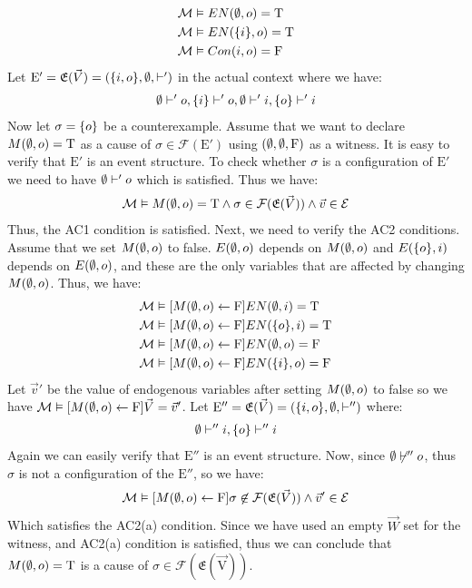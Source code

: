 \begin{example}
\begin{align*}
        \mathcal{M} & \vDash EN(\emptyset,o) = \mathrm{T}    \\
        \mathcal{M} & \vDash EN(\{i\},o) = \mathrm{T} \\
        \mathcal{M} & \vDash Con(i,o) = \mathrm{F}    \\
    \end{align*}
    Let $\mathrm{E'} = \mathfrak{E}(\vec V) = (\{i,o\},\emptyset,\vdash')$ 
    in the actual context where we have:
    \begin{align*}
        \emptyset \vdash' o, \{i\} \vdash' o, \emptyset \vdash' i, 
        \{o\} \vdash' i
    \end{align*}
    Now let $\sigma = \{o\}$ be a counterexample.     
    Assume that we want to declare $M(\emptyset,o) = \mathrm{T}$ as a cause of 
    $\sigma \in \mathcal{F}(\mathrm{E'})$ using $(\emptyset,\emptyset,\mathrm{F})$ as a witness.
    It is easy to verify that $\mathrm{E'}$ is an event structure.
    To check whether $\sigma$ is a configuration of $\mathrm{E'}$ we need
    to have $\emptyset \vdash' o$ which is satisfied.
    Thus we have:
    \begin{align*}
        \mathcal{M} \vDash M(\emptyset,o) = \mathrm{T} \wedge \sigma 
        \in \mathcal{F}(\mathfrak{E}(\vec V)) \wedge \vec v \in \mathcal{E}
    \end{align*}
    Thus, the AC1 condition is satisfied.
    Next, we need to verify the AC2 conditions.
    Assume that we set $M(\emptyset,o)$ to false.
    $E(\emptyset,o)$ depends on $M(\emptyset,o)$ and $E(\{o\},i)$ depends on $E(\emptyset,o)$,
    and these are the only variables that are affected by changing $M(\emptyset,o)$.
    Thus, we have:
    \begin{align*}
        \mathcal{M} & \vDash [M(\emptyset,o)\leftarrow \mathrm{F}] EN(\emptyset,i) = \mathrm{T} \\
        \mathcal{M} & \vDash [M(\emptyset,o)\leftarrow \mathrm{F}] EN(\{o\},i) = \mathrm{T} \\
        \mathcal{M} & \vDash [M(\emptyset,o)\leftarrow \mathrm{F}] EN(\emptyset,o) = \mathrm{F} \\
        \mathcal{M} & \vDash [M(\emptyset,o)\leftarrow \mathrm{F}] EN(\{i\},o) = \mathrm{F} 
    \end{align*}
    Let $\vec v'$ be the value of endogenous variables after setting 
    $M(\emptyset,o)$ to false so we have $\mathcal{M} \vDash [M(\emptyset,o)\leftarrow \mathrm{F}]\vec V = \vec v'$.
    Let $\mathrm{E}'' = \mathfrak{E}(\vec V) = (\{i,o\},\emptyset, \vdash'')$ where:
    \begin{align*}
        \emptyset \vdash'' i, \{o\} \vdash'' i
    \end{align*}
    Again we can easily verify that $\mathrm{E}''$ is an event structure.
    Now, since $\emptyset \not \vdash'' o$, thus $\sigma$ is not a configuration of
    the $\mathrm{E}''$, so we have:
    \begin{align*}
        \mathcal{M} \vDash [M(\emptyset,o) \leftarrow \mathrm{F}] \sigma \not \in \mathcal{F}(\mathfrak{E}(\vec V))
        \wedge \vec v' \in \mathcal{E}
    \end{align*}
    Which satisfies the AC2(a) condition.
    Since we have used an empty $\vec W$ set for the witness, and AC2(a)
    condition is satisfied, thus we can conclude that $M(\emptyset,o) = \mathrm{T}$ is a 
    cause of $\sigma \in \mathcal{F}(\mathrm{\mathfrak{E}(\vec V)})$.
\end{example}

